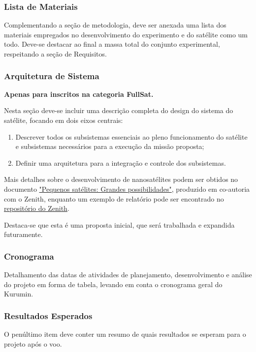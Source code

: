         \subsubsection{Lista de Materiais}
            Complementando a seção de metodologia, deve ser anexada uma lista dos materiais empregados no desenvolvimento do experimento e do satélite como um todo. Deve-se destacar ao final a massa total do conjunto experimental, respeitando a seção de Requisitos.

        \subsubsection{Arquitetura de Sistema}
            \textbf{Apenas para inscritos na categoria FullSat.}
            
            Nesta seção deve-se incluir uma descrição completa do design do sistema do satélite, focando em dois eixos centrais:
            \begin{enumerate}
                \item Descrever todos os subsistemas essenciais ao pleno funcionamento do satélite e subsistemas necessários para a execução da missão proposta;
                \item Definir uma arquitetura para a integração e controle dos subsistemas.
            \end{enumerate}

           Mais detalhes sobre o desenvolvimento de nanosatélites podem ser obtidos no documento \href{https://obsat.org.br/ebook/download.php?file=eBook-PequenosSatelites-Dez-2022.pdf}{\color{highcolor}"Pequenos satélites: Grandes possibilidades"}, produzido em co-autoria com o Zenith, enquanto um exemplo de relatório pode ser encontrado no \href{https://github.com/zenitheesc/USPSat-I/blob/master/USPSat_Report.pdf}{\color{highcolor}repositório do Zenith}.
            
            Destaca-se que esta é uma proposta inicial, que será trabalhada e expandida futuramente.
            
        \subsubsection{Cronograma}
            Detalhamento das datas de atividades de planejamento, desenvolvimento e análise do projeto em forma de tabela, levando em conta o cronograma geral do Kurumin.
                
        \subsubsection{Resultados Esperados}
            O penúltimo item deve conter um resumo de quais resultados se esperam para o projeto após o voo.
                    
